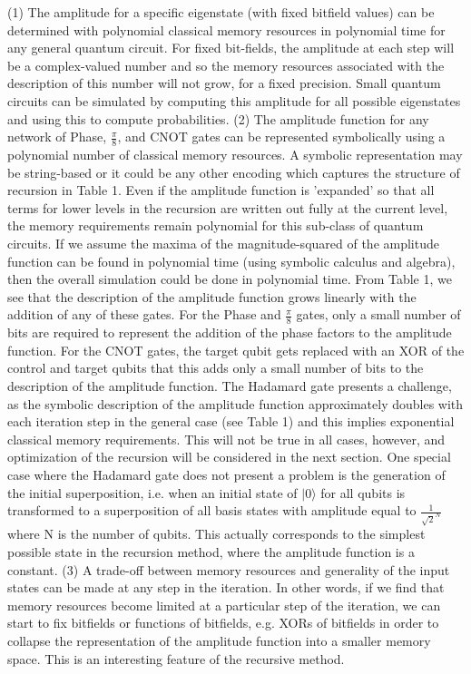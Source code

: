 \documentclass[reqno]{amsart}
\theoremstyle{definition}
\theoremstyle{remark}
\begin{document}
\newpage
(1) The amplitude for a specific eigenstate (with fixed bitfield values) can be determined with polynomial classical memory 
resources in polynomial time for any general quantum circuit. For fixed bit-fields, the amplitude at each step will be a complex-valued number and so the memory resources associated with the description of this number will not grow, for a fixed precision. Small quantum circuits can be simulated by computing this amplitude for all possible eigenstates and using this to compute probabilities.
\newline
\newline
(2) The amplitude function for any network of Phase, $\frac{\pi}{8}$, and CNOT gates can be represented symbolically using a polynomial number of classical memory resources. A symbolic representation may be string-based or it could be any other encoding which captures the structure of recursion in Table 1. Even if the amplitude function is 'expanded' so that all terms for lower levels in the recursion are written out fully at the current level, the memory requirements remain polynomial for this sub-class of quantum circuits. If we assume the maxima of the magnitude-squared of the amplitude function can be found in polynomial time (using symbolic calculus and algebra), then the overall simulation could be done in polynomial time. From Table 1, we see that the description of the amplitude function grows linearly with the addition of any of these gates. For the Phase and $\frac{\pi}{8}$ gates, only a small number of bits are required to represent the addition of the phase factors to the amplitude function. For the CNOT gates, the target qubit gets replaced with an XOR of the control and target qubits that this adds only a small number of bits to the description of the amplitude function. 
\noindent
\newline
\newline
The Hadamard gate presents a challenge, as the symbolic description of the amplitude function approximately doubles with each iteration step in the general case (see Table 1) and this implies exponential classical memory requirements. This will not be true in all cases, however, and optimization of the recursion will be considered in the next section. One special case where the Hadamard gate does not present a problem is the generation of the initial superposition, i.e. when an initial state of $|0\rangle$ for all qubits is transformed to a superposition of all basis states with amplitude equal to $\frac{1}{\sqrt{2}^N}$ where N is the number of qubits. This actually corresponds to the simplest possible state in the recursion method, where the amplitude function is a constant. 
\newline
\newline
(3) A trade-off between memory resources and generality of the input states can be made at any step in the iteration. In other words, if we find that memory resources become limited at a particular step of the iteration, we can start to fix bitfields or functions of bitfields, e.g. XORs of bitfields in order to collapse the representation of the amplitude function into a smaller memory space. This is an interesting feature of the recursive method.  
\end{document}
